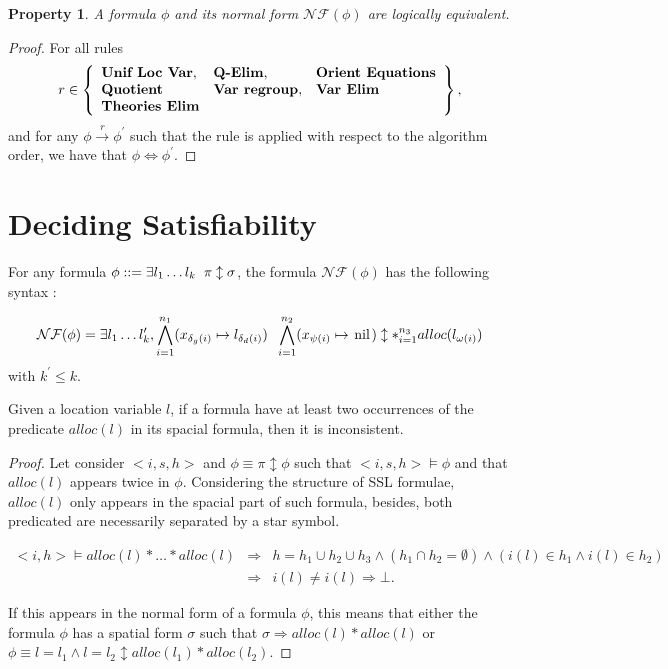 \documentclass[a4paper,twoside,12pt]{report}
\newtheorem{property}{Property}
\newcommand{\Alloc}[1]{alloc(#1)}
\newcommand{\Unsep}[0]{\ast}
\newcommand{\Sep}[2]{#1 \Unsep #2}
\newcommand{\Pointsto}[2]{ #1 \mapsto #2}
\newcommand{\nil}[0]{\lstinline!nil!}
\newcommand{\Pointstonil}[1]{ #1 \mapsto \mbox{\nil}}
\newcommand{\Formula}[2]{ #1  \updownarrow #2}
\newcommand{\NForm}[1]{\mathcal{NF}(#1)}
\begin{document}
\begin{property}
A formula $\phi$ and its normal form $\NForm{\phi}$ are logically equivalent.
\end{property}
\begin{proof}
For all rules $$r\in \left \lbrace \begin{array}{lll}
 \mbox{\textbf{Unif Loc Var}}, & \mbox{\textbf{Q-Elim}}, & \mbox{\textbf{Orient Equations}} \\  \mbox{\textbf{Quotient}} & \mbox{\textbf{Var regroup}}, & \mbox{\textbf{Var Elim}} \\ \mbox{\textbf{Theories Elim}}  &&\\ \end{array} \right \rbrace,$$ 
and for any $\phi \stackrel{r}{\to} \phi^{\prime}$ such that the rule is applied
with respect to the algorithm order, we have that $\phi \Leftrightarrow \phi^{\prime}.$
\end{proof}

\section{Deciding Satisfiability}


\begin{lemma}
\label{lemma:syntaxNF}

For any formula $\phi::= \exists l_1 \ldots l_k \gspace \Formula{\pi}{\sigma}$,
the formula $\NForm{\phi}$ has the following syntax :

$$ \NForm{\phi}=\exists l_1\ldots l_k^{\prime}, \Formula{\bigwedge_{i=1}^{n_1}(\Pointsto{x_{\delta_g(i)}}{l_{\delta_d(i)}}) \gspace \bigwedge_{i=1}^{n_2}(\Pointstonil{x_{\psi(i)}})}{\Unsep^{n_3}_{i=1} \Alloc{l_{\omega(i)}}}$$
with $k^{\prime}\leq k$.
\end{lemma}

\begin{lemma}
Given a location variable $l$, if a formula have at least two occurrences of the predicate $\Alloc{l}$ in its spacial formula, then it is inconsistent.
\end{lemma}
\begin{proof}
Let consider $<i,s,h>$ and $\phi \equiv \Formula{\pi}{\phi}$ such that $<i,s,h>\models \phi$ and that $\Alloc{l}$ appears twice in $\phi$.
Considering the structure of SSL formulae, $\Alloc{l}$ only appears in the spacial part of such formula, besides, both predicated are necessarily separated by
a star symbol.

\begin{eqnarray*}
<i,h>\models \Sep{\Alloc{l}}{\Sep{\ldots}{\Alloc{l}}} &\Rightarrow&
	h = h_1 \cup h_2 \cup h_3 \wedge (h_1 \cap h_2 = \emptyset) \wedge (i(l)\in h_1 \wedge i(l) \in h_2 ) \\
	&\Rightarrow& i(l) \neq i(l) \Rightarrow \bot.
\end{eqnarray*}

If this appears in the normal form of a formula $\phi$, this means that 
either the formula $\phi$ has a spatial form $\sigma$ such that $\sigma \Rightarrow \Sep{\Alloc{l}}{\Alloc{l}}$ or $\phi \equiv \Formula{l=l_1 \wedge l=l_2}{ \Sep{\Alloc{l_1}}{\Alloc{l_2}}}$.  
\end{proof}
\end{document}
